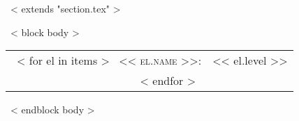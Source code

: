 ~< extends "section.tex" >~

~< block body >~

\begin{tabular}{rl}
    ~< for el in items >~
        \textsc{<< el.name >>:}&<< el.level >>\\
    ~< endfor >~
\end{tabular}

~< endblock body >~
